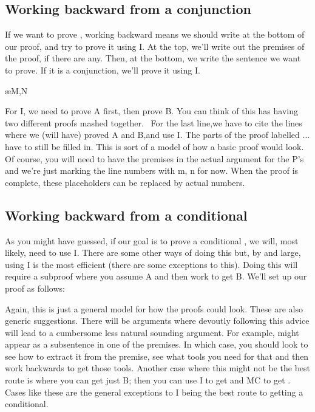 \subsection{Working backward from a conjunction}

If we want to prove \eand {}, working backward means we should write \eand {} at the bottom of our proof, and try to prove it using \eand I. At the top, we’ll write out the premises of the proof, if there are any. Then, at the bottom, we write the sentence we want to prove. If it is a conjunction, we’ll prove it using \eand I.
\begin{fitchproof}
\ellipsesline
{}			
\ellipsesline
{}			
\ellipsesline
{}			
\ae{M,N}	
\end{fitchproof}
For \eand I, we need to prove A first, then prove B. You can think of this has having two different proofs mashed together.  For the last line,we have to cite the lines where we (will have) proved A and B,and use \eand I. The parts of the proof labelled ... have to still be filled in. This is sort of a model of how a basic proof would look. Of course, you will need to have the premises in the actual argument for the P's and we're just marking the line numbers with m, n for now. When the proof is complete, these placeholders can be replaced by actual numbers.

\subsection{Working backward from a conditional}

As you might have guessed, if our goal is to prove a conditional \eif{}, we will, most likely, need to use \eif I. There are some other ways of doing this but, by and large, using \eif I is the most efficient (there are some exceptions to this). Doing this will require a subproof where you assume A and then work to get B. We’ll set up our proof as follows:
\begin{fitchproof}
\ellipsesline			
{}			
\open
{}			
\ellipsesline		
{}			
\close
{}	
\end{fitchproof}

Again, this is just a general model for how the proofs could look. These are also generic suggestions. There will be arguments where devoutly following this advice will lead to a cumbersome less natural sounding argument. For example, \eif {} might appear as a subsentence in one of the premises. In which case, you should look to see how to extract it from the premise, see what tools you need for that and then work backwards to get those tools. Another case where this might not be the best route is where you can get just B; then you can use \eor I to get \enot {}\eor {} and MC to get \eif {}. Cases like these are the general exceptions to \eif I being the best route to getting a conditional.

